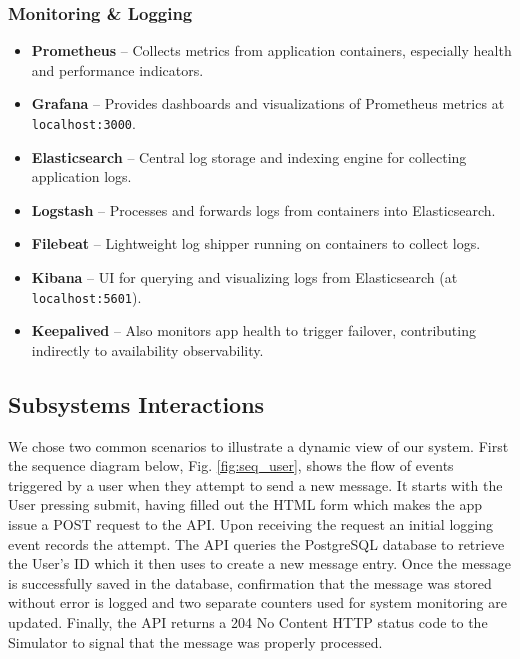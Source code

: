 \subsubsection*{Monitoring \& Logging}
\begin{itemize}
  \item \textbf{Prometheus} – Collects metrics from application containers, especially health and performance indicators.
  \item \textbf{Grafana} – Provides dashboards and visualizations of Prometheus metrics at \texttt{localhost:3000}.
  \item \textbf{Elasticsearch} – Central log storage and indexing engine for collecting application logs.
  \item \textbf{Logstash} – Processes and forwards logs from containers into Elasticsearch.
  \item \textbf{Filebeat} – Lightweight log shipper running on containers to collect logs.
  \item \textbf{Kibana} – UI for querying and visualizing logs from Elasticsearch (at \texttt{localhost:5601}).
  \item \textbf{Keepalived} – Also monitors app health to trigger failover, contributing indirectly to availability observability.
\end{itemize}

\subsection{Subsystems Interactions}
We chose two common scenarios to illustrate a dynamic view of our system. First the sequence diagram below, Fig. \ref{fig:seq_user}, shows the flow of events triggered by a user when they attempt to send a new message. It starts with the User pressing submit, having filled out the HTML form which makes the app issue a POST request to the API. Upon receiving the request an initial logging event records the attempt. The API queries the PostgreSQL database to retrieve the User's ID which it then uses to create a new message entry. Once the message is successfully saved in the database, confirmation that the message was stored without error is logged and two separate counters used for system monitoring are updated. Finally, the API returns a 204 No Content HTTP status code to the Simulator to signal that the message was properly processed.

